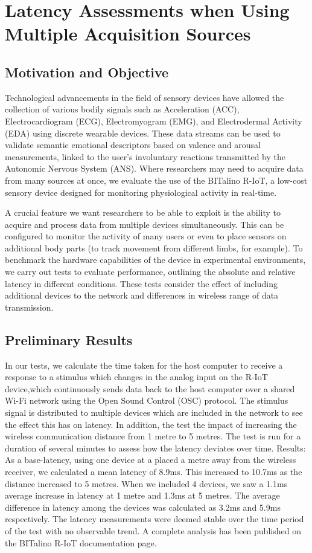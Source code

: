 \section{Latency Assessments when Using Multiple Acquisition Sources}

\subsection{Motivation and Objective}

Technological advancements in the field of sensory devices have allowed the collection of various bodily signals such as Acceleration (ACC), Electrocardiogram (ECG), Electromyogram (EMG), and Electrodermal Activity (EDA) using discrete wearable devices. These data streams can be used to validate semantic emotional descriptors based on valence and arousal measurements, linked to the user’s involuntary reactions transmitted by the Autonomic Nervous System (ANS). Where researchers may need to acquire data from many sources at once, we evaluate the use of the BITalino R-IoT, a low-cost sensory device designed for monitoring physiological activity in real-time.

A crucial feature we want researchers to be able to exploit is the ability to acquire and process data from multiple devices simultaneously. This can be configured to monitor the activity of many users or even to place sensors on additional body parts (to track movement from different limbs, for example). To benchmark the hardware capabilities of the device in experimental environments, we carry out tests to evaluate performance, outlining the absolute and relative latency in different conditions. These tests consider the effect of including additional devices to the network and differences in wireless range of data transmission.

\subsection{Preliminary Results}

In our tests, we calculate the time taken for the host computer to receive a response to a stimulus which changes in the analog input on the R-IoT device,which continuously sends data back to the host computer over a shared Wi-Fi network using the Open Sound Control (OSC) protocol. The stimulus signal is distributed to multiple devices which are included in the network to see the effect this has on latency. In addition, the test the impact of increasing the wireless communication distance from 1 metre to 5 metres. The test is run for a duration of several minutes to assess how the latency deviates over time.
Results: As a base-latency, using one device at a placed a metre away from the wireless receiver, we calculated a mean latency of 8.9ms. This increased to 10.7ms as the distance increased to 5 metres. When we included 4 devices, we saw a 1.1ms average increase in latency at 1 metre and 1.3ms at 5 metres. The average difference in latency among the devices was calculated as 3.2ms and 5.9ms respectively. The latency measurements were deemed stable over the time period of the test with no observable trend. A complete analysis has been published on the BITalino R-IoT documentation page.

